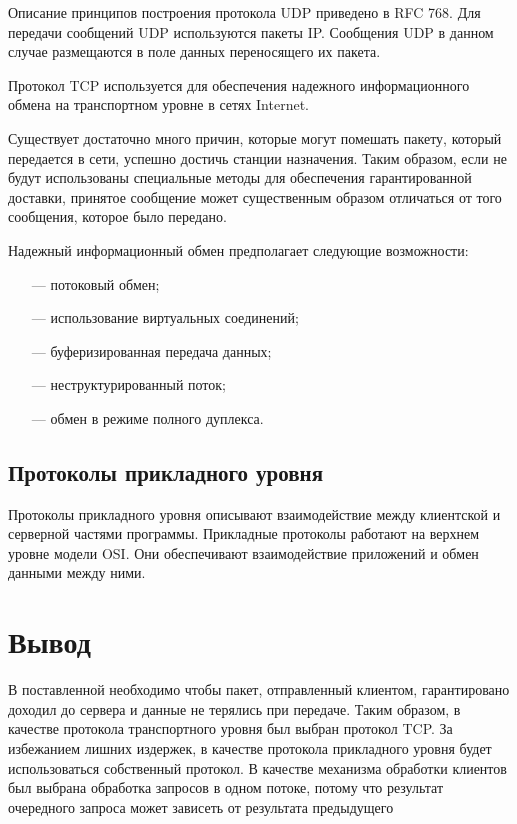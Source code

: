 Описание принципов построения протокола UDP приведено в RFC 768. Для передачи сообщений UDP используются пакеты IP. Сообщения UDP в данном случае размещаются в поле данных переносящего их пакета.

Протокол TCP используется для обеспечения надежного информаци­онного обмена на транспортном уровне в сетях Internet.

Существует достаточно много причин, которые могут помешать пакету, который передается в сети, успешно достичь станции назначения. Таким образом, если не будут использованы специальные методы для обеспечения гарантированной доставки, принятое сообщение может существенным образом отличаться от того сообщения, которое было передано.

Надежный информационный обмен предполагает следующие возмож­ности:
\begin{itemize}
	\item[---] потоковый обмен;
	\item[---] использование виртуальных соединений;
	\item[---] буферизированная передача данных;
	\item[---] неструктурированный поток;
	\item[---] обмен в режиме полного дуплекса.
\end{itemize}

\subsection{Протоколы прикладного уровня}

Протоколы прикладного уровня описывают взаимодействие между кли­ентской и серверной частями программы. Прикладные протоколы работают на верхнем уровне модели OSI. Они обеспечивают взаимодействие приложений и обмен данными между ними.

\section*{Вывод}

В поставленной необходимо чтобы пакет, отправленный клиентом, гарантировано доходил до сервера и данные не терялись при передаче. Таким образом, в качестве протокола транспортного уровня был выбран протокол TCP. За избежанием лишних издержек, в качестве протокола прикладного уровня будет использоваться собственный протокол. В качестве механизма обработки клиентов был выбрана обработка запросов в одном потоке, потому что результат очередного запроса может зависеть от результата предыдущего
